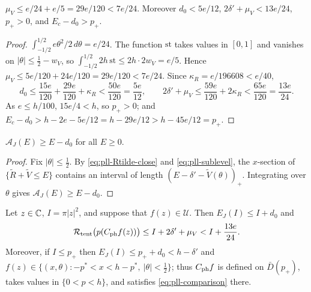 \begin{lemma}\label{lem:pll-mean}
$\mu_V\le e/24+e/5=29e/120<7e/24$. Moreover $d_0<5e/12$, $2\delta'+\mu_V<13e/24$, $p_+>0$, and $E_c-d_0>p_+$.
\end{lemma}

\begin{proof}
$\int_{-1/2}^{1/2}e\theta^2/2\,d\theta=e/24$. The function $\mathrm{st}$ takes values in $[0,1]$ and vanishes on
$|\theta|\le\frac12-w_V$, so $\int_{-1/2}^{1/2}2h\,\mathrm{st}\le2h\cdot2w_V=e/5$. Hence
$\mu_V\le5e/120+24e/120=29e/120<7e/24$. Since $\kappa_R=e/196608<e/40$,
\[
 d_0\le\frac{15e}{120}+\frac{29e}{120}+\kappa_R<\frac{50e}{120}=\frac{5e}{12},\qquad
 2\delta'+\mu_V\le\frac{59e}{120}+2\kappa_R<\frac{65e}{120}=\frac{13e}{24}.
\]
As $e\le h/100$, $15e/4<h$, so $p_+>0$; and $E_c-d_0>h-2e-5e/12=h-29e/12>h-45e/12=p_+$.
\end{proof}

\begin{lemma}\label{lem:pll-area}
$\mathcal A_J(E)\ge E-d_0$ for all $E\ge0$.
\end{lemma}

\begin{proof}
Fix $|\theta|\le\frac12$. By \eqref{eq:pll-Rtilde-close} and \eqref{eq:pll-sublevel}, the $x$-section of $\{\tilde R+\tilde V\le E\}$ contains an interval of length $(E-\delta'-\tilde V(\theta))_+$. Integrating over $\theta$ gives $\mathcal A_J(E)\ge E-d_0$.
\end{proof}

\begin{proposition}\label{prop:pll-comparison}
Let $z\in\mathbb{C}$, $I=\pi|z|^2$, and suppose that $f(z)\in\mathcal U$. Then $E_J(I)\le I+d_0$ and
\begin{equation}\label{eq:pll-comparison}
 \mathcal{R}_{\rm tent}\bigl(p(C_{\rm ph}f(z))\bigr)\le I+2\delta'+\mu_V<I+\frac{13e}{24}.
\end{equation}
Moreover, if $I\le p_+$ then $E_J(I)\le p_++d_0<h-\delta'$ and
$f(z)\in\{(x,\theta):-p^*<x<h-p^*,\ |\theta|<\frac12\}$; thus $C_{\rm ph}f$ is defined on $\bar D(p_+)$, takes
values in $\{0<p<h\}$, and satisfies \eqref{eq:pll-comparison} there.
\end{proposition}

